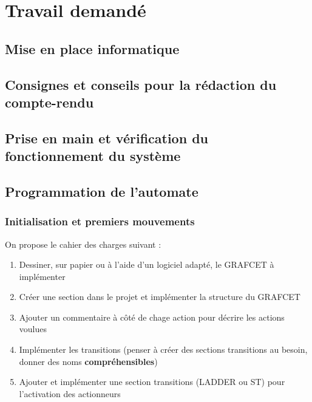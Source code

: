 \documentclass[11pt, multicol]{article}
\begin{document}
\section{Travail demandé}
\subsection{Mise en place informatique}

\subsection{Consignes et conseils pour la rédaction du compte-rendu}

\subsection{Prise en main et vérification du fonctionnement du système}


\subsection{Programmation de l'automate}
\subsubsection{Initialisation et premiers mouvements}
On propose le cahier des charges suivant :

\begin{UPSTIactivite}
	\label{act:montee}
	\begin{enumerate}
		\item Dessiner, sur papier ou à l'aide d'un logiciel adapté, le GRAFCET à implémenter
		\item Créer une section dans le projet et implémenter la structure du GRAFCET
		\item Ajouter un commentaire à côté de chage action pour décrire les actions voulues
		\item Implémenter les transitions (penser à créer des sections transitions au besoin, donner des noms \textbf{compréhensibles})
		\item Ajouter et implémenter une section transitions (LADDER ou ST) pour l'activation des actionneurs
	\end{enumerate}
\end{UPSTIactivite}
\end{document}
